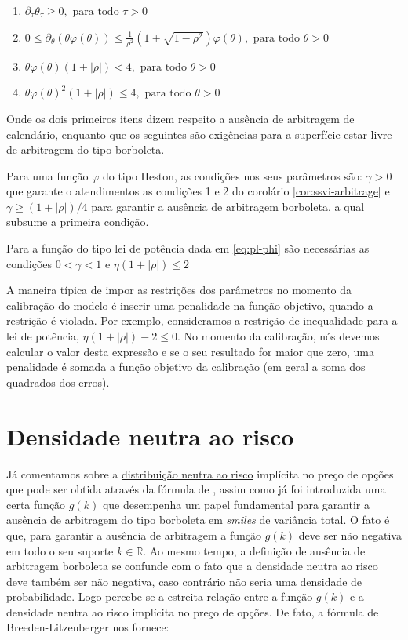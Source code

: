 \documentclass[]{book}
\providecommand{\tightlist}{%
  \setlength{\itemsep}{0pt}\setlength{\parskip}{0pt}}
\theoremstyle{definition}
\theoremstyle{definition}
\theoremstyle{definition}
\theoremstyle{remark}
\begin{document}
\begin{enumerate}
\def\labelenumi{\arabic{enumi}.}
\tightlist
\item
  \(\partial_\tau\theta_\tau\geq 0, \text{ para todo } \tau > 0\)
\item
  \(0\leq \partial_\theta(\theta\varphi(\theta))\leq\frac{1}{\rho^2}\left(1+\sqrt{1-\rho^2}\right)\varphi(\theta), \text{ para todo } \theta>0\)
\item
  \(\theta\varphi(\theta)(1+|\rho|)<4, \text{ para todo } \theta>0\)
\item
  \(\theta\varphi(\theta)^2(1+|\rho|)\leq 4, \text{ para todo } \theta>0\)
\end{enumerate}

Onde os dois primeiros itens dizem respeito a ausência de arbitragem de
calendário, enquanto que os seguintes são exigências para a superfície
estar livre de arbitragem do tipo borboleta.

Para uma função \(\varphi\) do tipo Heston, as condições nos seus
parâmetros são: \(\gamma>0\) que garante o atendimentos as condições 1 e
2 do corolário \ref{cor:ssvi-arbitrage} e \(\gamma\geq(1+|\rho|)/4\)
para garantir a ausência de arbitragem borboleta, a qual subsume a
primeira condição.

Para a função do tipo lei de potência dada em \eqref{eq:pl-phi} são
necessárias as condições \(0<\gamma<1\) e \(\eta(1+|\rho|)\leq 2\)

A maneira típica de impor as restrições dos parâmetros no momento da
calibração do modelo é inserir uma penalidade na função objetivo, quando
a restrição é violada. Por exemplo, consideramos a restrição de
inequalidade para a lei de potência, \(\eta(1+|\rho|)-2\leq 0\). No
momento da calibração, nós devemos calcular o valor desta expressão e se
o seu resultado for maior que zero, uma penalidade é somada a função
objetivo da calibração (em geral a soma dos quadrados dos erros).

\section{Densidade neutra ao risco}\label{densidade-neutra-ao-risco}

Já comentamos sobre a \protect\hyperlink{rnd}{distribuição neutra ao
risco} implícita no preço de opções que pode ser obtida através da
fórmula de \citep{Breeden1978}, assim como já foi introduzida uma certa
função \protect\hyperlink{svi}{\(g(k)\)} que desempenha um papel
fundamental para garantir a ausência de arbitragem do tipo borboleta em
\emph{smiles} de variância total. O fato é que, para garantir a ausência
de arbitragem a função \(g(k)\) deve ser não negativa em todo o seu
suporte \(k \in \mathbb R\). Ao mesmo tempo, a definição de ausência de
arbitragem borboleta se confunde com o fato que a densidade neutra ao
risco deve também ser não negativa, caso contrário não seria uma
densidade de probabilidade. Logo percebe-se a estreita relação entre a
função \(g(k)\) e a densidade neutra ao risco implícita no preço de
opções. De fato, a fórmula de Breeden-Litzenberger nos fornece:
\end{document}
